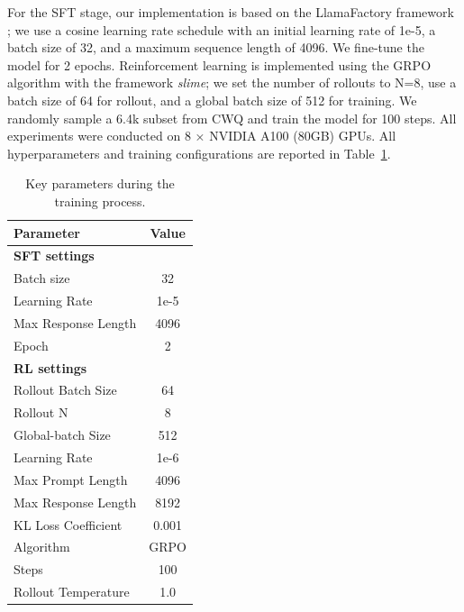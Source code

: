 
For the SFT stage, our implementation is based on the LlamaFactory framework \citep{zheng2024llamafactoryunifiedefficientfinetuning}; we use a cosine learning rate schedule with an initial learning rate of 1e-5, a batch size of 32, and a maximum sequence length of
4096. We fine-tune the model for 2 epochs. 
Reinforcement learning is implemented using the GRPO algorithm with the framework \emph{slime}; we set the number of rollouts to N=8, use a batch size of 64 for rollout, and a global batch size of 512 for training. We randomly sample a 6.4k subset from CWQ and train the model for 100 steps. 
All experiments were conducted on 8 × NVIDIA A100 (80GB) GPUs.
All hyperparameters and training configurations are reported in Table~\ref{tab:training-params}. 


\begin{table}[ht]
\centering
\caption{Key parameters during the training process.}
\label{tab:training-params}
\begin{tabular}{l c}
\toprule
\textbf{Parameter} & \textbf{Value} \\
\midrule
\multicolumn{2}{l}{\textbf{SFT settings}} \\
\midrule
Batch size & 32 \\
Learning Rate & 1e-5 \\
Max Response Length & 4096 \\
Epoch & 2 \\
\midrule
\multicolumn{2}{l}{\textbf{RL settings}} \\
\midrule
Rollout Batch Size & 64 \\
Rollout N & 8 \\
Global-batch Size & 512 \\
Learning Rate & 1e-6 \\
Max Prompt Length & 4096 \\
Max Response Length & 8192 \\
KL Loss Coefficient & 0.001 \\
Algorithm & GRPO \\
Steps & 100 \\
Rollout Temperature & 1.0 \\
\bottomrule
\end{tabular}
\end{table}

